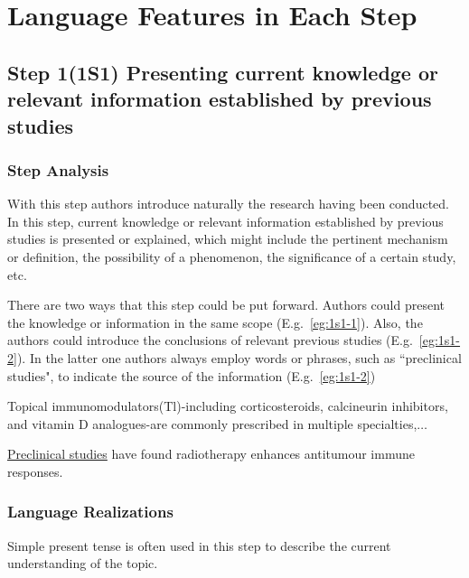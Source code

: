 \documentclass{ctexbook}
\begin{document}
\section{Language Features in Each Step}

  \subsection{Step 1(1S1) Presenting current knowledge or relevant information established by previous studies}

    \subsubsection{Step Analysis}

    With this step authors introduce naturally the research having been conducted. In this step, current knowledge or relevant information established by previous studies is presented or explained, which might include the pertinent mechanism or definition, the possibility of a phenomenon, the significance of a certain study, etc.
    
    There are two ways that this step could be put forward. Authors could present the knowledge or information in the same scope (E.g.~\ref{eg:1s1-1}). Also, the authors could introduce the conclusions of relevant previous studies (E.g.~\ref{eg:1s1-2}). In the latter one authors always employ words or phrases, such as “preclinical studies", to indicate the source of the information (E.g.~\ref{eg:1s1-2})
    
    \begin{eg}[label={eg:1s1-1}]{}
      Topical immunomodulators(Tl)-including corticosteroids, calcineurin inhibitors, and vitamin D analogues-are commonly prescribed in multiple specialties,$\dots$
    \end{eg}

    \begin{eg}[label={eg:1s1-2}]{}
      \uline{Preclinical studies} have found radiotherapy enhances antitumour immune responses.
    \end{eg}

    \subsubsection{Language Realizations}

    Simple present tense is often used in this step to describe the current understanding of the topic.
\end{document}
